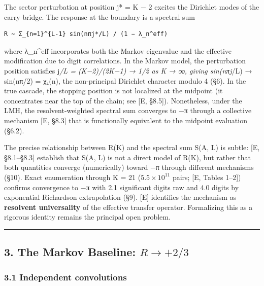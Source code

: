 \documentclass[
  11pt,
]{article}
\begin{document}
The sector perturbation at position j* = K − 2 excites the Dirichlet modes of
the carry bridge. The response at the boundary is a spectral sum

\begin{verbatim}
R ~ Σ_{n=1}^{L-1} sin(nπj*/L) / (1 − λ_n^eff)
\end{verbatim}

where λ\_n\^{}eff incorporates both the Markov eigenvalue and the effective
modification due to digit correlations. In the Markov model, the perturbation
position satisfies j\emph{/L = (K−2)/(2K−1) → 1/2 as K → ∞, giving sin(nπj}/L) →
sin(nπ/2) = χ₄(n), the non-principal Dirichlet character modulo 4 (§6). In the
true cascade, the stopping position is not localized at the midpoint (it
concentrates near the top of the chain; see {[}E, §8.5{]}). Nonetheless, under
the LMH, the resolvent-weighted spectral sum converges to −π through a
collective mechanism {[}E, §8.3{]} that is functionally equivalent to the
midpoint evaluation (§6.2).

The precise relationship between R(K) and the spectral sum S(A, L) is subtle:
{[}E, §8.1--§8.3{]} establish that S(A, L) is not a direct model of R(K), but
rather that both quantities converge (numerically) toward −π through different
mechanisms (§10). Exact enumeration through K = 21 (\(5.5 \times 10^{11}\)
pairs; {[}E, Tables 1--2{]}) confirms convergence to −π with 2.1 significant
digits raw and 4.0 digits by exponential Richardson extrapolation (§9). {[}E{]}
identifies the mechanism as \textbf{resolvent universality} of the effective
transfer operator. Formalizing this as a rigorous identity remains the principal
open problem.

\begin{center}\rule{0.5\linewidth}{0.5pt}\end{center}

\newpage

\subsection{\texorpdfstring{3. The Markov Baseline:
\(R \to +2/3\)}{3. The Markov Baseline: R \textbackslash to +2/3}}\label{the-markov-baseline-r-to-23}

\subsubsection{3.1 Independent convolutions}\label{independent-convolutions}
\end{document}

